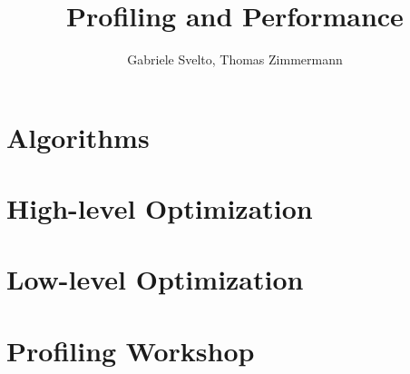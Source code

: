 \documentclass{beamer}
\author{Gabriele Svelto, Thomas Zimmermann}
\title{Profiling and Performance}
\begin{document}
 \frame{\titlepage}

 \begin{frame}
  \tableofcontents
 \end{frame}

 \section[algo]{Algorithms}

 \begin{frame}
  \tableofcontents[currentsection]
 \end{frame}

 

 \section[highlevel]{High-level Optimization}

 \begin{frame}
  \tableofcontents[currentsection]
 \end{frame}

 

 \section[lowlevel]{Low-level Optimization}

 \begin{frame}
  \tableofcontents[currentsection]
 \end{frame}

 

 \section[profiling]{Profiling Workshop}

 \begin{frame}
  \tableofcontents[currentsection]
 \end{frame}

 
\end{document}
